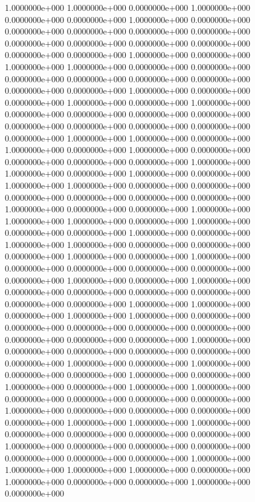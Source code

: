   1.0000000e+000  1.0000000e+000  0.0000000e+000  1.0000000e+000  0.0000000e+000
  0.0000000e+000  1.0000000e+000  0.0000000e+000  0.0000000e+000  0.0000000e+000
  0.0000000e+000  0.0000000e+000  0.0000000e+000  0.0000000e+000  0.0000000e+000
  0.0000000e+000  0.0000000e+000  0.0000000e+000  1.0000000e+000  0.0000000e+000
  1.0000000e+000  1.0000000e+000  0.0000000e+000  0.0000000e+000  0.0000000e+000
  0.0000000e+000  0.0000000e+000  0.0000000e+000  0.0000000e+000  0.0000000e+000
  1.0000000e+000  0.0000000e+000  0.0000000e+000  1.0000000e+000  0.0000000e+000
  1.0000000e+000  0.0000000e+000  0.0000000e+000  0.0000000e+000  0.0000000e+000
  0.0000000e+000  0.0000000e+000  0.0000000e+000  0.0000000e+000  0.0000000e+000
  1.0000000e+000  1.0000000e+000  0.0000000e+000  1.0000000e+000  0.0000000e+000
  1.0000000e+000  0.0000000e+000  0.0000000e+000  0.0000000e+000  0.0000000e+000
  1.0000000e+000  1.0000000e+000  0.0000000e+000  1.0000000e+000  0.0000000e+000
  1.0000000e+000  1.0000000e+000  0.0000000e+000  0.0000000e+000  0.0000000e+000
  0.0000000e+000  0.0000000e+000  0.0000000e+000  1.0000000e+000  0.0000000e+000
  0.0000000e+000  1.0000000e+000  1.0000000e+000  1.0000000e+000  0.0000000e+000
  1.0000000e+000  0.0000000e+000  0.0000000e+000  1.0000000e+000  0.0000000e+000
  1.0000000e+000  1.0000000e+000  0.0000000e+000  0.0000000e+000  0.0000000e+000
  1.0000000e+000  0.0000000e+000  1.0000000e+000  0.0000000e+000  0.0000000e+000
  0.0000000e+000  0.0000000e+000  0.0000000e+000  1.0000000e+000  0.0000000e+000
  1.0000000e+000  0.0000000e+000  0.0000000e+000  0.0000000e+000  0.0000000e+000
  0.0000000e+000  0.0000000e+000  1.0000000e+000  1.0000000e+000  0.0000000e+000
  1.0000000e+000  1.0000000e+000  0.0000000e+000  0.0000000e+000  0.0000000e+000
  0.0000000e+000  0.0000000e+000  0.0000000e+000  0.0000000e+000  0.0000000e+000
  1.0000000e+000  0.0000000e+000  0.0000000e+000  0.0000000e+000  0.0000000e+000
  0.0000000e+000  1.0000000e+000  0.0000000e+000  1.0000000e+000  0.0000000e+000
  0.0000000e+000  1.0000000e+000  0.0000000e+000  1.0000000e+000  0.0000000e+000
  1.0000000e+000  1.0000000e+000  0.0000000e+000  0.0000000e+000  0.0000000e+000
  0.0000000e+000  1.0000000e+000  0.0000000e+000  0.0000000e+000  0.0000000e+000
  0.0000000e+000  1.0000000e+000  1.0000000e+000  1.0000000e+000  0.0000000e+000
  0.0000000e+000  0.0000000e+000  0.0000000e+000  1.0000000e+000  0.0000000e+000
  0.0000000e+000  0.0000000e+000  0.0000000e+000  0.0000000e+000  0.0000000e+000
  1.0000000e+000  1.0000000e+000  1.0000000e+000  1.0000000e+000  0.0000000e+000
  1.0000000e+000  0.0000000e+000  0.0000000e+000  1.0000000e+000  0.0000000e+000
